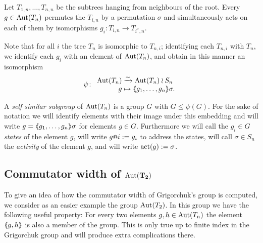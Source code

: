 \documentclass[a4paper,11pt]{amsart}
\begin{document}
Let $T_{1,n},\dotsc,T_{n,n}$ be the subtrees hanging from neighbours of the root. 
Every $g\in\operatorname{{Aut}}(T_n)$ permutes the $T_{i,n}$ by a permutation $\sigma$ and simultaneously
acts on each of them by isomorphisms $g_i\colon T_{i,n}\to T_{i^\sigma,n}$.

Note that for all $i$ the tree $T_n$ is isomorphic to $T_{n,i}$; identifying each $T_{n,i}$ with $T_n$, 
we identify each $g_i$ with an element of $\operatorname{{Aut}}(T_n)$, and obtain in this manner an isomorphism
\[\psi\colon\begin{array}{r@{\;}l}
              \Aut(T_n) &\xrightarrow{\sim} \Aut(T_n)\wr S_n\\
              g &\mapsto \pair{g_1,\dotsc,g_n}\sigma.
            \end{array}
\]

A \emph{self similar subgroup} of $\operatorname{{Aut}}(T_n)$ is a group $G$ with $G\leq \psi(G)$. 
For the sake of notation we will identify elements with their image under this embedding
and will write $g=\langle\negthickspace\langle g_1,\dotsc,g_n\rangle\negthickspace\rangle\sigma$ for elements $g\in G$. 
Furthermore we will call the $g_i\in G$ \emph{states} of the element $g$,
will write $g\at{i}:=g_i$ to address the states, will
call $\sigma \in S_n$ the \emph{activity} of the element $g$, 
and will write $\operatorname{act}(g):= \sigma$. 


\subsection{Commutator width of \texorpdfstring{$\mathbf{\textup{Aut}(T_2)}$}{Aut(T2)} }
To give an idea of how the commutator width of Grigorchuk's group is computed,
we consider as an easier example the group $\operatorname{{Aut}}(T_2)$. In this group
we have the following useful property: For every two elements $g,h\in \operatorname{{Aut}}(T_n)$ the %
element $\langle\negthickspace\langle g,h\rangle\negthickspace\rangle$ is also a member of the group.
This is only true up to finite index in the Grigorchuk group
and will produce extra complications there.
\end{document}
